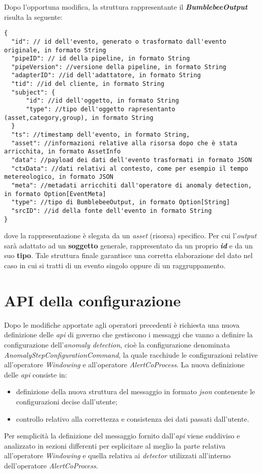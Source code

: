 Dopo l'opportuna modifica, la struttura rappresentante il \textbf{\textit{BumblebeeOutput}} risulta la seguente:

\begin{verbatim}
{
  "id": // id dell'evento, generato o trasformato dall'evento originale, in formato String
  "pipeID": // id della pipeline, in formato String
  "pipeVersion": //versione della pipeline, in formato String
  "adapterID": //id dell'adattatore, in formato String
  "tid": //id del cliente, in formato String
  "subject": {
	  "id": //id dell'oggetto, in formato String
	  "type": //tipo dell'oggetto rapresentanto (asset,category,group), in formato String
  }
  "ts": //timestamp dell'evento, in formato String,
  "asset": //informazioni relative alla risorsa dopo che è stata arricchita, in formato AssetInfo
  "data": //payload dei dati dell'evento trasformati in formato JSON
  "ctxData": //dati relativi al contesto, come per esempio il tempo metereologico, in formato JSON
  "meta": //metadati arricchiti dall'operatore di anomaly detection, in formato Option[EventMeta]
  "type": //tipo di BumblebeeOutput, in formato Option[String]
  "srcID": //id della fonte dell'evento in formato String
}
\end{verbatim}
dove la rappresentazione è slegata da un \textit{asset} (risorsa) specifico. Per cui l'\textit{output} sarà adattato ad un \textbf{soggetto} generale, rappresentato da un proprio \textbf{\textit{id}} e da un suo \textbf{tipo}.
Tale struttura finale garantisce una corretta elaborazione del dato nel caso in cui si tratti di un evento singolo oppure di un raggruppamento.


\section{API della configurazione}\label{sec:api-configurazione}
Dopo le modifiche apportate agli operatori precedenti è richiesta una nuova definizione delle \textit{\gls{api}} di governo che gestiscono i messaggi che vanno a definire la configurazione dell'\textit{anomaly detection}, cioè la configurazione denominata \textit{AnomalyStepConfigurationCommand}, la quale racchiude le configurazioni relative all'operatore \textit{Windowing} e all'operatore \textit{AlertCoProcess}. La nuova definizione delle \textit{\gls{api}} consiste in:

\begin{itemize}
	\item{definizione della nuova struttura del messaggio in formato \textit{\gls{json}} contenente le configurazioni decise dall'utente;}
	\item{controllo relativo alla correttezza e consistenza dei dati passati dall'utente.}
\end{itemize}
Per semplicità la definizione del messaggio fornito dall'\textit{\gls{api}} viene suddiviso e analizzato in sezioni differenti per esplicitare al meglio la parte relativa all'operatore \textit{Windowing} e quella relativa ai \textit{detector} utilizzati all'interno dell'operatore \textit{AlertCoProcess}.





